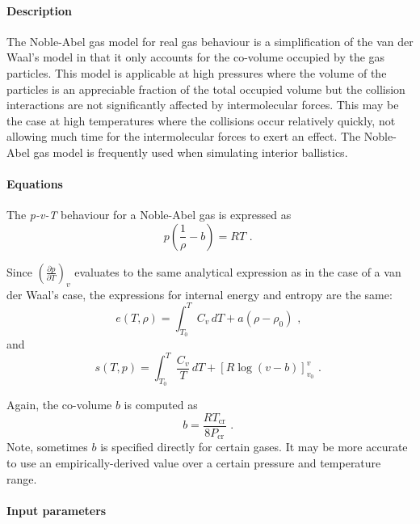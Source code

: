 \paragraph{Description}
The Noble-Abel gas model for real gas behaviour is a simplification of
the van der Waal's model in that it only accounts for the co-volume
occupied by the gas particles.
This model is applicable at high pressures where the volume of
the particles is an appreciable fraction of the total occupied volume
but the collision interactions are not significantly affected
by intermolecular forces.
This may be the case at high temperatures where the collisions
occur relatively quickly, not allowing much time for the intermolecular
forces to exert an effect.
The Noble-Abel gas model is frequently used when simulating interior
ballistics.

\paragraph{Equations}
The \textit{p-v-T} behaviour for a Noble-Abel gas is expressed as
\begin{equation}
  p \left( \frac{1}{\rho} - b \right ) = RT \text{ . }
\end{equation}

Since $\left( \frac{\partial p}{\partial T} \right)_v$ evaluates to the same analytical expression as in the case of a van der Waal's case, the expressions for internal
energy and entropy are the same:
\begin{equation}
e(T, \rho) = \int_{T_0}^{T} C_v\,dT + a \left( \rho - \rho_0 \right) \text{ , }
\end{equation}
and 
\begin{equation}
s(T,p) = \int_{T_0}^{T} \frac{C_v}{T}\,dT + \left [ R \log \left( v - b \right ) \right ]_{v_0}^{v} \text { . }
\end{equation}

Again, the co-volume $b$ is computed as
\begin{equation}
   b = \frac{R T_{\text{cr}}}{8 P_{\text{cr}}} \text{ . }
\end{equation}
Note, sometimes $b$ is specified directly for certain gases.
It may be more accurate to use an empirically-derived value
over a certain pressure and temperature range.

\paragraph{Input parameters}

